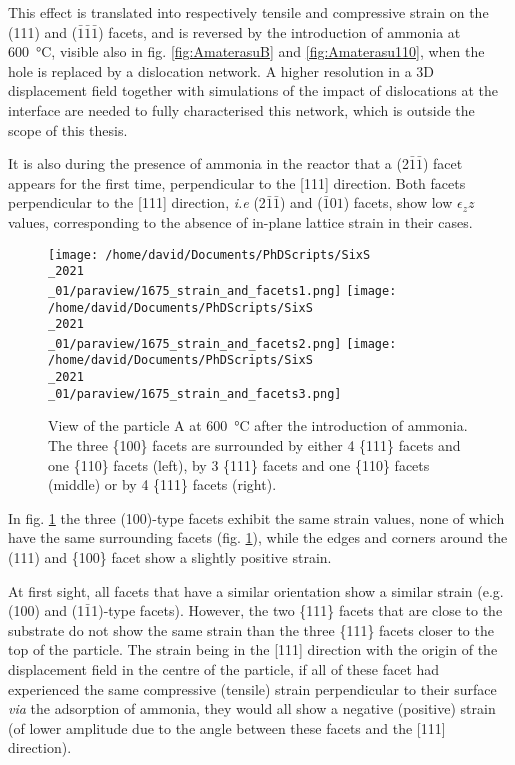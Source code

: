 {This effect is translated into respectively tensile and compressive strain on the (111) and ($\bar{1}\bar{1}\bar{1}$) facets, and is reversed by the introduction of ammonia at \qty{600}{\degreeCelsius}, visible also in fig. \ref{fig:AmaterasuB} and \ref{fig:Amaterasu110}, when the hole is replaced by a dislocation network.
A higher resolution in a 3D displacement field together with simulations of the impact of dislocations at the interface are needed to fully characterised this network, which is outside the scope of this thesis.

It is also during the presence of ammonia in the reactor that a (2$\bar{1}\bar{1}$) facet appears for the first time, perpendicular to the [111] direction.
Both facets perpendicular to the [111] direction, \textit{i.e} (2$\bar{1}\bar{1}$) and ($\bar{1}01$) facets, show low $\epsilon_zz$ values, corresponding to the absence of in-plane lattice strain in their cases.

\begin{figure}[!htb]
    \centering
    \texttt{[image: /home/david/Documents/PhDScripts/SixS\\\_2021\\\_01/paraview/1675\_strain\_and\_facets1.png]}
    \texttt{[image: /home/david/Documents/PhDScripts/SixS\\\_2021\\\_01/paraview/1675\_strain\_and\_facets2.png]}
    \texttt{[image: /home/david/Documents/PhDScripts/SixS\\\_2021\\\_01/paraview/1675\_strain\_and\_facets3.png]}
    \caption{
        View of the particle A at \qty{600}{\degreeCelsius} after the introduction of ammonia.
        The three \{100\} facets are surrounded by either 4 \{111\} facets and one \{110\} facets (left), by 3 \{111\} facets and one \{110\} facets (middle) or by 4 \{111\} facets (right).
    }
    \label{fig:AmaterasuStrain1675}
\end{figure}


In fig. \ref{fig:AmaterasuStrain1675} the three (100)-type facets exhibit the same strain values, none of which have the same surrounding facets (fig. \ref{fig:AmaterasuStrain1675}), while the edges and corners around the (111) and \{100\} facet show a slightly positive strain.

At first sight, all facets that have a similar orientation show a similar strain (e.g. (100) and (1$\bar{1}$1)-type facets).
However, the two \{111\} facets that are close to the substrate do not show the same strain than the three \{111\} facets closer to the top of the particle.
The strain being in the [111] direction with the origin of the displacement field in the centre of the particle, if all of these facet had experienced the same compressive (tensile) strain perpendicular to their surface \textit{via} the adsorption of ammonia, they would all show a negative (positive) strain (of lower amplitude due to the angle between these facets and the [111] direction).

}
